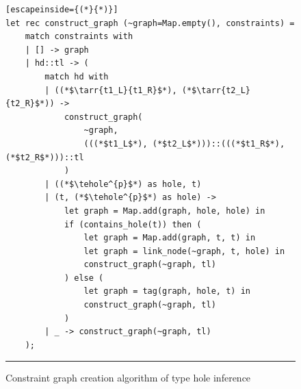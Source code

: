 

\begin{figure}[h!]
\begin{lstlisting}[escapeinside={(*}{*)}]
let rec construct_graph (~graph=Map.empty(), constraints) =
    match constraints with
    | [] -> graph
    | hd::tl -> (
        match hd with
        | ((*$\tarr{t1_L}{t1_R}$*), (*$\tarr{t2_L}{t2_R}$*)) ->
            construct_graph(
                ~graph, 
                (((*$t1_L$*), (*$t2_L$*)))::(((*$t1_R$*), (*$t2_R$*)))::tl
            )
        | ((*$\tehole^{p}$*) as hole, t)
        | (t, (*$\tehole^{p}$*) as hole) ->
            let graph = Map.add(graph, hole, hole) in
            if (contains_hole(t)) then (
                let graph = Map.add(graph, t, t) in
                let graph = link_node(~graph, t, hole) in
                construct_graph(~graph, tl)
            ) else (
                let graph = tag(graph, hole, t) in
                construct_graph(~graph, tl)
            )
        | _ -> construct_graph(~graph, tl)
    );

\end{lstlisting}
\vspace{-4px}
\hrule
\caption{Constraint graph creation algorithm of type hole inference}
\label{fig:algcode_construct_graph}
\end{figure}


